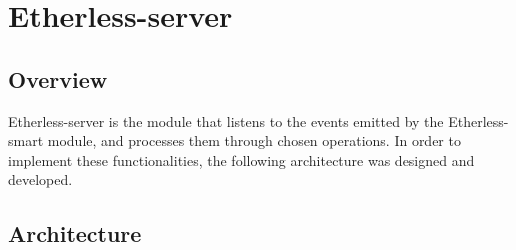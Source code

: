 \section{Etherless-server}
	\subsection{Overview} %
	Etherless-server is the module that listens to the events emitted by the Etherless-smart module, and processes them through chosen operations. In order to implement these functionalities, the following architecture was designed and developed.
	\subsection{Architecture}
